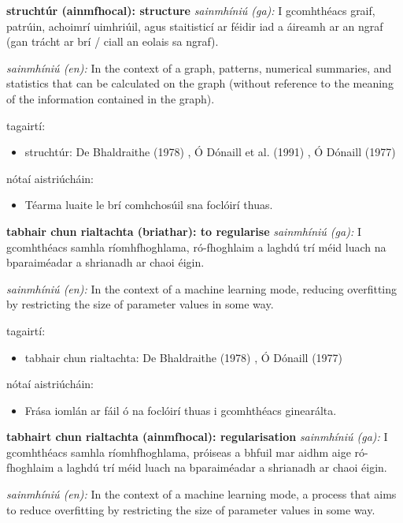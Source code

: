 \documentclass{article}
\begin{document}
\textbf{struchtúr (ainmfhocal): structure}
\textit{sainmhíniú (ga):} I gcomhthéacs graif, patrúin, achoimrí uimhriúil, agus staitisticí ar féidir iad a áireamh ar an ngraf (gan trácht ar brí / ciall an eolais sa ngraf).

\textit{sainmhíniú (en):} In the context of a graph, patterns, numerical summaries, and statistics that can be calculated on the graph (without reference to the meaning of the information contained in the graph).

tagairtí:
\begin{itemize}
	\item struchtúr: De Bhaldraithe (1978) \cite{de-bhaldraithe}, Ó Dónaill et al. (1991) \cite{focloir-beag}, Ó Dónaill (1977) \cite{odonaill}
\end{itemize}

nótaí aistriúcháin:
\begin{itemize}
	\item Téarma luaite le brí comhchosúil sna foclóirí thuas.
\end{itemize}


\textbf{tabhair chun rialtachta (briathar): to regularise}
\textit{sainmhíniú (ga):} I gcomhthéacs samhla ríomhfhoghlama, ró-fhoghlaim a laghdú trí méid luach na bparaiméadar a shrianadh ar chaoi éigin.

\textit{sainmhíniú (en):} In the context of a machine learning mode, reducing overfitting by restricting the size of parameter values in some way.

tagairtí:
\begin{itemize}
	\item tabhair chun rialtachta: De Bhaldraithe (1978) \cite{de-bhaldraithe}, Ó Dónaill (1977) \cite{odonaill}
\end{itemize}

nótaí aistriúcháin:
\begin{itemize}
	\item Frása iomlán ar fáil ó na foclóirí thuas i gcomhthéacs ginearálta.
\end{itemize}


\textbf{tabhairt chun rialtachta (ainmfhocal): regularisation}
\textit{sainmhíniú (ga):} I gcomhthéacs samhla ríomhfhoghlama, próiseas a bhfuil mar aidhm aige ró-fhoghlaim a laghdú trí méid luach na bparaiméadar a shrianadh ar chaoi éigin.

\textit{sainmhíniú (en):} In the context of a machine learning mode, a process that aims to reduce overfitting by restricting the size of parameter values in some way.
\end{document}
